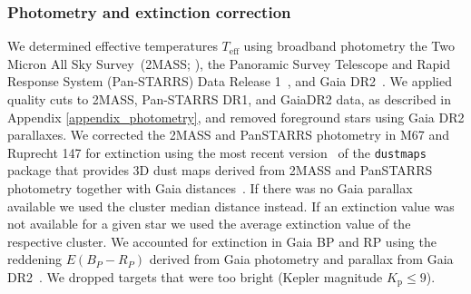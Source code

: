 \documentclass{aa}
\begin{document}

\subsubsection{Photometry and extinction correction}
We determined effective temperatures $T_\mathrm{eff}$ using broadband photometry the Two Micron All Sky Survey~(2MASS; \citealt{skrutskie_two_2006}), the Panoramic Survey Telescope and Rapid Response System \mbox{(Pan-STARRS)} Data Release 1~\citep{2016arXiv161205560C}, and Gaia DR2~\citep{gaia_dr2_release_2018}. We applied quality cuts to 2MASS, Pan-STARRS DR1, and GaiaDR2 data, as described in Appendix \ref{appendix_photometry}, and removed foreground stars using Gaia DR2 parallaxes. We corrected the 2MASS and PanSTARRS photometry in M67 and Ruprecht 147 for extinction using the most recent version~\citep{green_bayestar_2019} of the \texttt{dustmaps} package that provides 3D dust maps derived from 2MASS and PanSTARRS photometry together with Gaia distances~\citep{green_dustmaps_2018}. If there was no Gaia parallax available we used the cluster median distance instead. If an extinction value was not available for a given star we used the average extinction value of the respective cluster. We accounted for extinction in Gaia BP and RP using the reddening $E(B_P-R_P)$ derived from Gaia photometry and parallax from Gaia DR2~\citep{andrae_gaiaapsis_2018}. We dropped targets that were too bright (Kepler magnitude $K_\mathrm{p} \leq 9$).
\\
\end{document}
